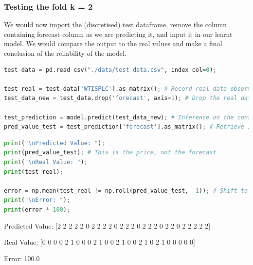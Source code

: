 \hypertarget{testing-the-fold-k-2}{%
\subsubsection{Testing the fold k = 2}\label{testing-the-fold-k-2}}

We would now import the (discretised) test dataframe, remove the column
containing forecast column as we are predicting it, and input it in our
learnt model. We would compare the output to the real values and make a
final conclusion of the reliability of the model.

\begin{lstlisting}[language=Python]
test_data = pd.read_csv("./data/test_data.csv", index_col=0);

test_real = test_data['WTISPLC'].as_matrix(); # Record real data observation, to be compared with the predicted one
test_data_new = test_data.drop('forecast', axis=1); # Drop the real data observation so that it does not bias prediction

test_prediction = model.predict(test_data_new); # Inference on the constructed graphical model
pred_value_test = test_prediction['forecast'].as_matrix(); # Retrieve it as an array so we can compare with real value
\end{lstlisting}

\begin{lstlisting}[language=Python]
print("\nPredicted Value: ");
print(pred_value_test); # This is the price, not the forecast
print("\nReal Value: ");
print(test_real);

error = np.mean(test_real != np.roll(pred_value_test, -1)); # Shift to get forecast
print("\nError: ");
print(error * 100);
\end{lstlisting}

Predicted Value: {[}2 2 2 2 2 0 2 2 2 2 0 2 2 2 0 2 2 2 0 2 2 0 2 2 2 2
2{]}

Real Value: {[}0 0 0 0 2 1 0 0 0 2 1 0 0 2 1 0 0 2 1 0 2 1 0 0 0 0 0{]}

Error: 100.0

